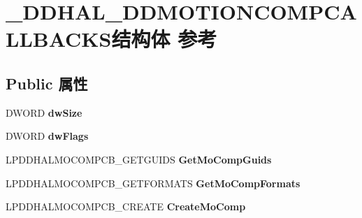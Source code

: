 \hypertarget{struct___d_d_h_a_l___d_d_m_o_t_i_o_n_c_o_m_p_c_a_l_l_b_a_c_k_s}{}\section{\+\_\+\+D\+D\+H\+A\+L\+\_\+\+D\+D\+M\+O\+T\+I\+O\+N\+C\+O\+M\+P\+C\+A\+L\+L\+B\+A\+C\+K\+S结构体 参考}
\label{struct___d_d_h_a_l___d_d_m_o_t_i_o_n_c_o_m_p_c_a_l_l_b_a_c_k_s}
\subsection*{Public 属性}
\begin{DoxyCompactItemize}
\item 
\mbox{\label{struct___d_d_h_a_l___d_d_m_o_t_i_o_n_c_o_m_p_c_a_l_l_b_a_c_k_s_a6bdd12fd4eec62058d31ce458d49d279}} 
D\+W\+O\+RD {\bfseries dw\+Size}
\item 
\mbox{\label{struct___d_d_h_a_l___d_d_m_o_t_i_o_n_c_o_m_p_c_a_l_l_b_a_c_k_s_a2d06f60e08cdb462c3261e542155d9dc}} 
D\+W\+O\+RD {\bfseries dw\+Flags}
\item 
\mbox{\label{struct___d_d_h_a_l___d_d_m_o_t_i_o_n_c_o_m_p_c_a_l_l_b_a_c_k_s_a0fa7b7527eb25e5292c7d139c9332257}} 
L\+P\+D\+D\+H\+A\+L\+M\+O\+C\+O\+M\+P\+C\+B\+\_\+\+G\+E\+T\+G\+U\+I\+DS {\bfseries Get\+Mo\+Comp\+Guids}
\item 
\mbox{\label{struct___d_d_h_a_l___d_d_m_o_t_i_o_n_c_o_m_p_c_a_l_l_b_a_c_k_s_a4436ae446929d49f45e565905a66ef25}} 
L\+P\+D\+D\+H\+A\+L\+M\+O\+C\+O\+M\+P\+C\+B\+\_\+\+G\+E\+T\+F\+O\+R\+M\+A\+TS {\bfseries Get\+Mo\+Comp\+Formats}
\item 
\mbox{\label{struct___d_d_h_a_l___d_d_m_o_t_i_o_n_c_o_m_p_c_a_l_l_b_a_c_k_s_a0a1eeca2e0adf72d387d6cf3e22dd377}} 
L\+P\+D\+D\+H\+A\+L\+M\+O\+C\+O\+M\+P\+C\+B\+\_\+\+C\+R\+E\+A\+TE {\bfseries Create\+Mo\+Comp}
\item 

\end{DoxyCompactItemize}
